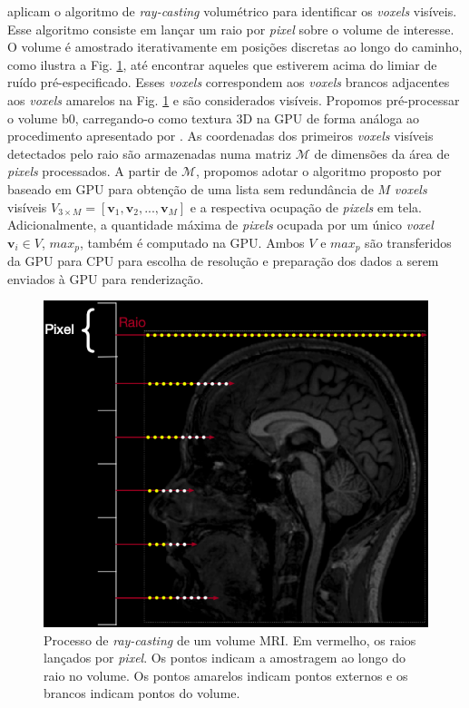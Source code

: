   aplicam o algoritmo de \textit{ray-casting} volumétrico para identificar os \textit{voxels} visíveis. Esse algoritmo consiste em lançar um raio por \textit{pixel} sobre o volume de interesse. O volume é amostrado iterativamente em posições discretas ao longo do caminho, como ilustra a Fig. \ref{fig::raycasting_2d}, até encontrar aqueles que estiverem acima do limiar de ruído pré-especificado. Esses \textit{voxels} correspondem aos \textit{voxels} brancos adjacentes aos \textit{voxels} amarelos na Fig. \ref{fig::raycasting_2d} e são considerados visíveis. Propomos pré-processar o volume b0, carregando-o como textura 3D na GPU de forma análoga ao procedimento apresentado por . As coordenadas dos primeiros \textit{voxels} visíveis detectados pelo raio são armazenadas numa matriz $\mathscr{M}$ de dimensões da área de \textit{pixels} processados. A partir de $\mathscr{M}$, propomos adotar o algoritmo proposto por  baseado em GPU para obtenção de uma lista sem redundância de $M$ \textit{voxels} visíveis $V_{3 \times M} = [
\mathbf{v}_1,
\mathbf{v}_2, ..., 
\mathbf{v}_M
]$ e a respectiva ocupação de \textit{pixels} em tela. Adicionalmente, a quantidade máxima de \textit{pixels} ocupada por um único \textit{voxel} $\mathbf{v}_i \in V$, $max_p$, também é computado na GPU. Ambos $V$ e $max_p$ são transferidos da GPU para CPU para escolha de resolução e preparação dos dados a serem enviados à GPU para renderização.

 
 \begin{figure}[ht]
    \centering
    \includegraphics[width=.55\linewidth, angle=0]{figs/Esquema_Glifo/raycasting/raycasting_2d_2.png}
    \caption{Processo de \textit{ray-casting} de um volume MRI. Em vermelho, os raios lançados por \textit{pixel}. Os pontos indicam a amostragem ao longo do raio no volume. Os pontos amarelos indicam pontos externos e os brancos indicam pontos do volume.
     }
     \label{fig::raycasting_2d}
\end{figure}


